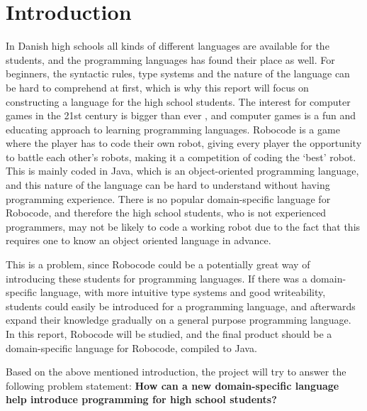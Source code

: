 \chapter{Introduction}

In Danish high schools all kinds of different languages are available for the students, and the programming languages has found their place as well. For beginners, the syntactic rules, type systems and the nature of the language can be hard to comprehend at first, which is why this report will focus on constructing a language for the high school students. The interest for computer games in the 21st century is bigger than ever \citep{Wankel}, and computer games is a fun and educating approach to learning programming languages. Robocode is a game where the player has to code their own robot, giving every player the opportunity to battle each other’s robots, making it a competition of coding the ‘best’ robot. This is mainly coded in Java, which is an object-oriented programming language, and this nature of the language can be hard to understand without having programming experience. There is no popular domain-specific language for Robocode, and therefore the high school students, who is not experienced programmers, may not be likely to code a working robot due to the fact that this requires one to know an object oriented language in advance. 

This is a problem, since Robocode could be a potentially great way of introducing these students for programming languages. If there was a domain-specific language, with more intuitive type systems and good writeability, students could easily be introduced for a programming language, and afterwards expand their knowledge gradually on a general purpose programming language. In this report, Robocode will be studied, and the final product should be a domain-specific language for Robocode, compiled to Java.
	
Based on the above mentioned introduction, the project will try to answer the following problem statement: 
\textbf{How can a new domain-specific language help introduce programming for high school students?} 